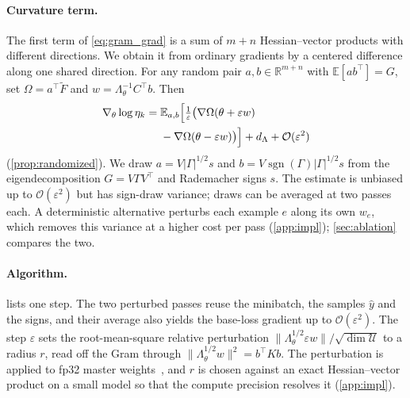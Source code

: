 \documentclass[11pt]{article}
\newcommand{\R}{\mathbb{R}}
\newcommand{\U}{\mathcal{U}}
\newcommand{\Lam}{\Lambda_{\theta}}
\newcommand{\Ft}{\widetilde{F}}
\newcommand{\etak}{\eta_{k}}
\begin{document}
\paragraph{Curvature term.}
The first term of \cref{eq:gram_grad} is a sum of $m+n$ Hessian--vector products with different directions. We obtain it from ordinary gradients by a centered difference along one shared direction. For any random pair $a,b\in\R^{m+n}$ with $\mathbb E[ab^\top]=G$, set $\Omega=a^\top\Ft$ and $w=\Lam^{-1}C^\top b$. Then
\begin{equation}
\begin{aligned}
\nabla_\theta\log\etak={}&\mathbb E_{a,b}\Bigl[\tfrac{1}{\varepsilon}\bigl(\nabla\Omega(\theta+\varepsilon w)\\
&-\nabla\Omega(\theta-\varepsilon w)\bigr)\Bigr]+d_\Lambda+\mathcal O(\varepsilon^2)
\end{aligned}
\label{eq:outer}
\end{equation}
(\cref{prop:randomized}). We draw $a=V|\Gamma|^{1/2}s$ and $b=V\operatorname{sgn}(\Gamma)|\Gamma|^{1/2}s$ from the eigendecomposition $G=V\Gamma V^\top$ and Rademacher signs $s$. The estimate is unbiased up to $\mathcal O(\varepsilon^2)$ but has sign-draw variance; draws can be averaged at two passes each. A deterministic alternative perturbs each example $e$ along its own $w_e$, which removes this variance at a higher cost per pass (\cref{app:impl}); \cref{sec:ablation} compares the two.

\paragraph{Algorithm.}
 lists one step. The two perturbed passes reuse the minibatch, the samples $\hat y$ and the signs, and their average also yields the base-loss gradient up to $\mathcal O(\varepsilon^2)$. The step $\varepsilon$ sets the root-mean-square relative perturbation $\|\Lam^{1/2}\varepsilon w\|/\sqrt{\dim\U}$ to a radius $r$, read off the Gram through $\|\Lam^{1/2}w\|^2=b^\top Kb$. The perturbation is applied to fp32 master weights~\citep{micikevicius2018mixed}, and $r$ is chosen against an exact Hessian--vector product on a small model so that the compute precision resolves it (\cref{app:impl}).
\end{document}
